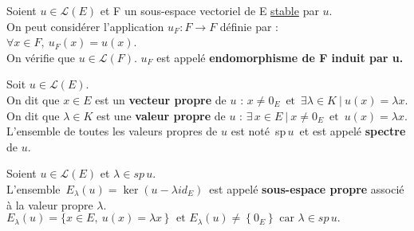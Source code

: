 \vspace{1.3cm}

Soient \(u\in \mathscr{L}(E)\) et F un sous-espace vectoriel de E \underline{stable} par $u$.\\
On peut considérer l'application \(u_F :F \to F\) définie par : \(\forall x\in F,\ u_F(x)=u(x)\).\\
On vérifie que \(u\in \mathscr{L}(F)\). $u_F$ est appelé \textbf{endomorphisme de F induit par u.}

\vspace{1.3cm}

Soit \(u\in \mathscr{L}(E)\).\\
On dit que \(x\in E\) est un \textbf{vecteur propre} de $u$ \ssi : \(x\neq 0_E\, \text{ et }\, \exists \lambda \in K \ \rvert \ u(x)=\lambda x.\)\\
On dit que \(\lambda \in K\) est une \textbf{valeur propre} de $u$ \ssi : \(\exists\, x\in E \ \rvert \ x\neq 0_E \, \text{ et }\,  u(x)=\lambda x.\)\\
L'ensemble de toutes les valeurs propres de $u$ est noté\, sp$\,u\,$ et est appelé \textbf{spectre} de $u$.

\vspace{1.3cm}

Soient \(u\in \mathscr{L}(E)\) et \(\lambda \in sp\,u.\)\vspace{0.1cm}\\
L'ensemble \(\,E_\lambda(u)=\ker (u-\lambda id_E)\,\) est appelé \textbf{sous-espace propre} associé à la valeur propre $\lambda$.\vspace{0.1cm}
\(E_\lambda(u)=\{x\in E,\ u(x)=\lambda x\,\}\; \text{ et } E_\lambda(u)\neq \left\{0_E\right\} \text{ car } \lambda\in sp\,u.\) 

\vspace{1.3cm}

